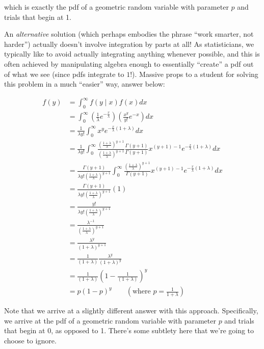 \documentclass[
  letterpaper,
  DIV=11,
  numbers=noendperiod]{scrreprt}
\begin{document}
which is exactly the pdf of a geometric random variable with parameter
\(p\) and trials that begin at 1.

An \emph{alternative} solution (which perhaps embodies the phrase ``work
smarter, not harder'') actually doesn't involve integration by parts at
all! As statisticians, we typically like to avoid actually integrating
anything whenever possible, and this is often achieved by manipulating
algebra enough to essentially ``create'' a pdf out of what we see (since
pdfs integrate to \(1\)!). Massive props to a student for solving this
problem in a much ``easier'' way, answer below:

\begin{align*}
        f(y) &= \int_{0}^{\infty} f(y \mid x) f(x) dx \\
        &= \int_{0}^{\infty} (\frac{1}{\lambda}e^{-\frac{x}{\lambda}}) (\frac{x^y}{y!} e^{-x}) dx \\
        &= \frac{1}{\lambda y!} \int_{0}^{\infty} x^y e^{-\frac{x}{\lambda}(1 + \lambda)} dx \\
        &= \frac{1}{\lambda y!} \int_{0}^{\infty} \frac{(\frac{1+\lambda}{\lambda})^{y+1}}{(\frac{1+\lambda}{\lambda})^{y+1}} \frac{\Gamma(y+1)}{\Gamma(y+1)} x^{(y+1)-1} e^{-\frac{x}{\lambda}(1 + \lambda)} dx\\
        &= \frac{\Gamma(y+1)}{\lambda y! (\frac{1+\lambda}{\lambda})^{y+1}} \int_{0}^{\infty} \frac{(\frac{1+\lambda}{\lambda})^{y+1}}{\Gamma(y+1)} x^{(y+1)-1} e^{-\frac{x}{\lambda}(1 + \lambda)} dx\\
        &= \frac{\Gamma(y+1)}{\lambda y! (\frac{1+\lambda}{\lambda})^{y+1}} (1)\\
        &= \frac{y!}{\lambda y! (\frac{1+\lambda}{\lambda})^{y+1}} \\
        &= \frac{\lambda^{-1}}{(\frac{1+\lambda}{\lambda})^{y+1}}\\
        &= \frac{\lambda^y}{(1+\lambda)^{y+1}}\\
        &= \frac{1}{(1+\lambda)} \frac{\lambda^y}{(1+\lambda)^y}\\
        &= \frac{1}{(1+\lambda)} (1 - \frac{1}{(1+\lambda)})^y \\
        &=p(1-p)^y\qquad (\text{where }p=\frac{1}{1+\lambda})
    \end{align*}

Note that we arrive at a slightly different answer with this approach.
Specifically, we arrive at the pdf of a geometric random variable with
parameter \(p\) and trials that begin at 0, as opposed to 1. There's
some subtlety here that we're going to choose to ignore.
\end{document}
